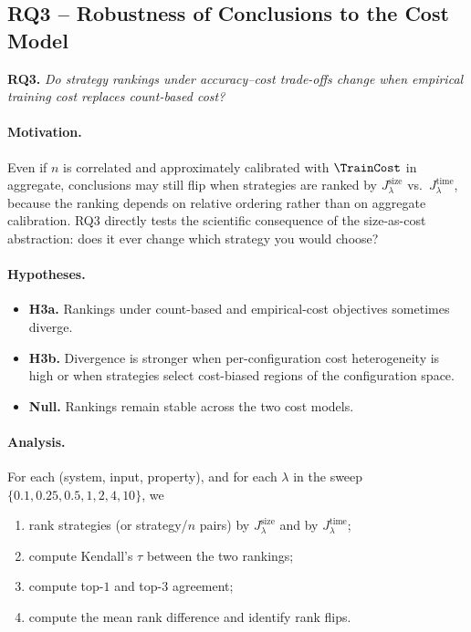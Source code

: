 \subsection{RQ3 -- Robustness of Conclusions to the Cost Model}
\label{subsec:rq3}

\textbf{RQ3.} \emph{Do strategy rankings under accuracy--cost trade-offs change
when empirical training cost replaces count-based cost?}

\paragraph*{Motivation.}
Even if $n$ is correlated and approximately calibrated with $\TrainCost$ in
aggregate, conclusions may still flip when strategies are ranked by
$J^{\text{size}}_\lambda$ vs.\ $J^{\text{time}}_\lambda$, because the ranking
depends on relative ordering rather than on aggregate calibration. RQ3 directly
tests the scientific consequence of the size-as-cost abstraction: does it
ever change which strategy you would choose?

\paragraph*{Hypotheses.}
\begin{itemize}
    \item \textbf{H3a.} Rankings under count-based and empirical-cost
    objectives sometimes diverge.
    \item \textbf{H3b.} Divergence is stronger when per-configuration cost
    heterogeneity is high or when strategies select cost-biased regions of the
    configuration space.
    \item \textbf{Null.} Rankings remain stable across the two cost models.
\end{itemize}

\paragraph*{Analysis.}
For each (system, input, property), and for each $\lambda$ in the sweep
$\{0.1,0.25,0.5,1,2,4,10\}$, we
\begin{enumerate}
    \item rank strategies (or strategy/$n$ pairs) by $J^{\text{size}}_\lambda$
    and by $J^{\text{time}}_\lambda$;
    \item compute Kendall's $\tau$ between the two rankings;
    \item compute top-$1$ and top-$3$ agreement;
    \item compute the mean rank difference and identify rank flips.
\end{enumerate}


